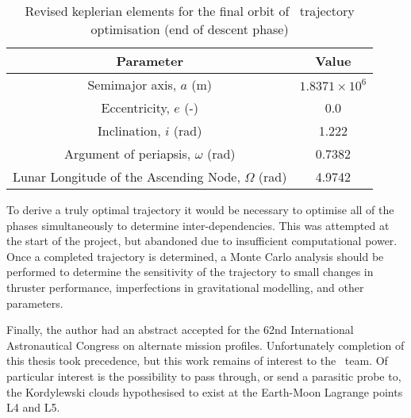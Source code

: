 \begin{table}[h]
\caption{Revised keplerian elements for the final orbit of \BW\ trajectory optimisation (end of descent phase)}
\label{tab:Phase-5-constraints-revised}
\begin{center}
\begin{tabular} {cc}\toprule
Parameter & Value\\\midrule
Semimajor axis, $a$ (m) & $1.8371\times 10^6$\\
Eccentricity, $e$ (-) & 0.0\\
Inclination, $i$ (rad) & 1.222\\
Argument of periapsis, $\omega$ (rad) & 0.7382 \\
Lunar Longitude of the Ascending Node, $\Omega$ (rad) & 4.9742 \\\bottomrule
\end{tabular}
\end{center}
\end{table}

To derive a truly optimal trajectory it would be necessary to optimise all of the phases simultaneously to determine inter-dependencies. This was attempted at the start of the project, but abandoned due to insufficient computational power. Once a completed trajectory is determined, a Monte Carlo analysis should be performed to determine the sensitivity of the trajectory to small changes in thruster performance, imperfections in gravitational modelling, and other parameters.

Finally, the author had an abstract accepted for the 62nd International Astronautical Congress on alternate mission profiles. Unfortunately completion of this thesis took precedence, but this work remains of interest to the \BW\ team. Of particular interest is the possibility to pass through, or send a parasitic probe to, the Kordylewski clouds hypothesised to exist at the Earth-Moon Lagrange points L4 and L5.



